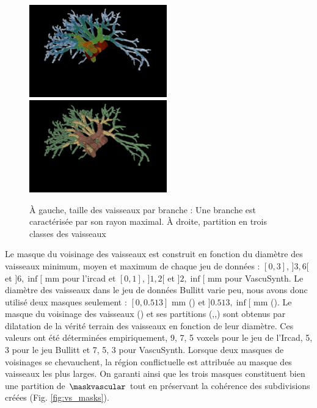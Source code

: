 \begin{figure}[!ht]
  \centering
  \includegraphics[height=4cm]{Images/vs_labels.png}
  \includegraphics[height=4cm]{Images/vs_labelMask.png}
  \caption{À gauche, taille des vaisseaux par branche : Une branche est caractérisée par son rayon maximal. À droite, partition en trois classes des vaisseaux }
  \label{fig:vessels_partition}
\end{figure}

Le masque du voisinage des vaisseaux est construit en fonction du diamètre des vaisseaux minimum, moyen et maximum de chaque jeu de données : $[0,3]$, $]3,6[$ et $]6,\inf[$ mm pour l'ircad et $[0,1]$, $]1,2[$ et $]2,\inf[$ mm pour VascuSynth. Le diamètre des vaisseaux dans le jeu de données Bullitt varie peu, nous avons donc utilisé deux masques seulement : $[0,0.513]$ mm (\maskvesselSmall) et $]0.513,\inf[$ mm (\maskvesselMedium). Le masque du voisinage des vaisseaux (\maskvessel) et ses partitions (\maskvesselLarge,\maskvesselMedium,\maskvesselSmall) sont obtenus par dilatation de la vérité terrain des vaisseaux en fonction de leur diamètre. Ces valeurs ont été déterminées empiriquement, 9, 7, 5 voxels pour le jeu de l'Ircad, 5, 3 pour le jeu Bullitt et 7, 5, 3 pour VascuSynth. Lorsque deux masques de voisinages se chevauchent, la région conflictuelle est attribuée au masque des vaisseaux les plus larges. On garanti ainsi que les trois masques constituent bien une partition de $\maskvascular$ tout en préservant la cohérence des subdivisions créées (Fig. \ref{fig:vs_masks}).


